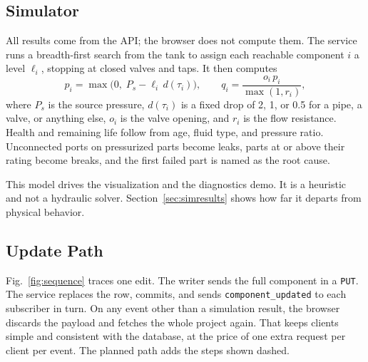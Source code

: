 \documentclass[conference]{IEEEtran}
\begin{document}
\subsection{Simulator}
All results come from the API; the browser does not compute them. The service runs a breadth-first search from the tank to assign each reachable component $i$ a level $\ell_i$, stopping at closed valves and taps. It then computes
\begin{equation}
p_i = \max\bigl(0,\; P_s - \ell_i\, d(\tau_i)\bigr), \qquad
q_i = \frac{o_i\, p_i}{\max(1, r_i)},
\label{eq:sim}
\end{equation}
where $P_s$ is the source pressure, $d(\tau_i)$ is a fixed drop of 2, 1, or 0.5 for a pipe, a valve, or anything else, $o_i$ is the valve opening, and $r_i$ is the flow resistance. Health and remaining life follow from age, fluid type, and pressure ratio. Unconnected ports on pressurized parts become leaks, parts at or above their rating become breaks, and the first failed part is named as the root cause.

This model drives the visualization and the diagnostics demo. It is a heuristic and not a hydraulic solver. Section~\ref{sec:simresults} shows how far it departs from physical behavior.

\subsection{Update Path}
Fig.~\ref{fig:sequence} traces one edit. The writer sends the full component in a \texttt{PUT}. The service replaces the row, commits, and sends \texttt{component\_updated} to each subscriber in turn. On any event other than a simulation result, the browser discards the payload and fetches the whole project again. That keeps clients simple and consistent with the database, at the price of one extra request per client per event. The planned path adds the steps shown dashed.
\end{document}
